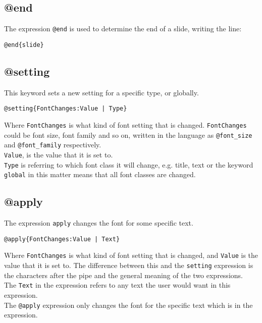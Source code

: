 \subsection{@end}
\label{@end}
The expression \texttt{@end} is used to determine the end of a slide, writing the line: 
\begin{lstlisting}[frame=single]
@end{slide}
\end{lstlisting}

\subsection{@setting}
This keyword sets a new setting for a specific type, or globally.
\begin{lstlisting}[frame=single]
@setting{FontChanges:Value | Type}
\end{lstlisting}
Where \texttt{FontChanges} is what kind of font setting that is changed. 
\texttt{FontChanges} could be font size, font family and so on, written in the language as \texttt{@font\_size} and \texttt{@font\_family} respectively. \\
\texttt{Value}, is the value that it is set to. \\
\texttt{Type} is referring to which font class it will change, e.g. title, text or the keyword \texttt{global} in this matter means that all font classes are changed.

\subsection{@apply}
The expression \texttt{apply} changes the font for some specific text.
\begin{lstlisting}[frame=single]
@apply{FontChanges:Value | Text}
\end{lstlisting}
Where \texttt{FontChanges} is what kind of font setting that is changed, and \texttt{Value} is the value that it is set to. The difference between this and the \texttt{setting} expression is the characters after the pipe and the general meaning of the two expressions. \\
The \texttt{Text} in the expression refers to any text the user would want in this expression. \\
The \texttt{@apply} expression only changes the font for the specific text which is in the expression.

